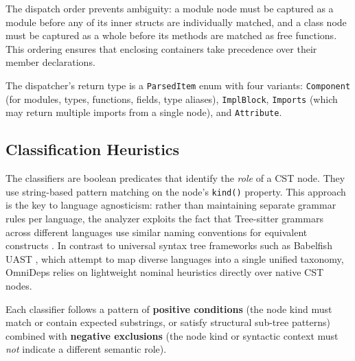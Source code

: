 The dispatch order prevents ambiguity: a module node must be captured
as a module before any of its inner structs are individually matched,
and a class node must be captured as a whole before its methods are
matched as free functions. This ordering ensures that enclosing containers take
precedence over their member declarations.

The dispatcher's return type is a \texttt{ParsedItem} enum with four
variants: \texttt{Component} (for modules, types, functions, fields,
type aliases), \texttt{ImplBlock}, \texttt{Imports} (which may return
multiple imports from a single node), and \texttt{Attri}\-\texttt{bute}.

\subsection{Classification Heuristics}
\label{sec:classifiers}

The classifiers are boolean predicates that identify the
\textit{role} of a CST node. They use string-based pattern matching
on the node's \texttt{kind()} property. This approach is the key to
language agnosticism: rather than maintaining separate grammar rules
per language, the analyzer exploits the fact that Tree-sitter
grammars across different languages use similar naming conventions
for equivalent constructs \cite{brunsfeld_treesitter_2018}.
In contrast to universal syntax tree frameworks such as Babelfish
UAST \cite{babelfish_uast},
which attempt to map diverse languages into a single unified
taxonomy, OmniDeps relies
on lightweight nominal heuristics directly over native CST nodes.

Each classifier follows a pattern of \textbf{positive conditions} (the
  node kind must match or contain expected substrings, or satisfy structural
sub-tree patterns) combined with \textbf{negative exclusions} (the node kind
or syntactic context must \textit{not} indicate a different semantic role).

